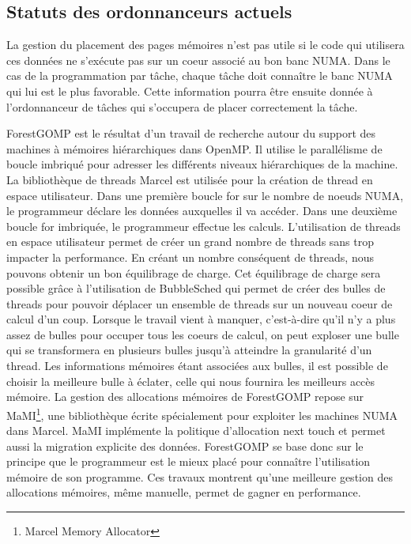 \subsection{Statuts des ordonnanceurs actuels}
La gestion du placement des pages mémoires n'est pas utile si le code qui utilisera ces données ne s'exécute pas sur un coeur associé au bon banc NUMA.
%
Dans le cas de la programmation par tâche, chaque tâche doit connaître le banc NUMA qui lui est le plus favorable.
%
Cette information pourra être ensuite donnée à l'ordonnanceur de tâches qui s'occupera de placer correctement la tâche.


ForestGOMP\cite{Bro10Thesis} est le résultat d'un travail de recherche autour du support des machines à mémoires hiérarchiques dans OpenMP.
%
Il utilise le parallélisme de boucle imbriqué pour adresser les différents niveaux hiérarchiques de la machine.
%
La bibliothèque de threads Marcel\cite{marcel} est utilisée pour la création de thread en espace utilisateur.
%
Dans une première boucle for sur le nombre de noeuds NUMA, le programmeur déclare les données auxquelles il va accéder.
%
Dans une deuxième boucle for imbriquée, le programmeur effectue les calculs.
%
L'utilisation de threads en espace utilisateur permet de créer un grand nombre de threads sans trop impacter la performance.
%
En créant un nombre conséquent de threads, nous pouvons obtenir un bon équilibrage de charge.
%
Cet équilibrage de charge sera possible grâce à l'utilisation de BubbleSched\cite{bubblesched} qui permet de créer des bulles de threads pour pouvoir déplacer un ensemble de threads sur un nouveau coeur de calcul d'un coup.
%
Lorsque le travail vient à manquer, c'est-à-dire qu'il n'y a plus assez de bulles pour occuper tous les coeurs de calcul, on peut exploser une bulle qui se transformera en plusieurs bulles jusqu'à atteindre la granularité d'un thread.
%
Les informations mémoires étant associées aux bulles, il est possible de choisir la meilleure bulle à éclater, celle qui nous fournira les meilleurs accès mémoire.
%
La gestion des allocations mémoires de ForestGOMP repose sur MaMI\footnote{Marcel Memory Allocator}, une bibliothèque écrite spécialement pour exploiter les machines NUMA dans Marcel.
%
MaMI implémente la politique d'allocation next touch et permet aussi la migration explicite des données.
%
ForestGOMP se base donc sur le principe que le programmeur est le mieux placé pour connaître l'utilisation mémoire de son programme.
%
Ces travaux montrent qu'une meilleure gestion des allocations mémoires, même manuelle, permet de gagner en performance.


